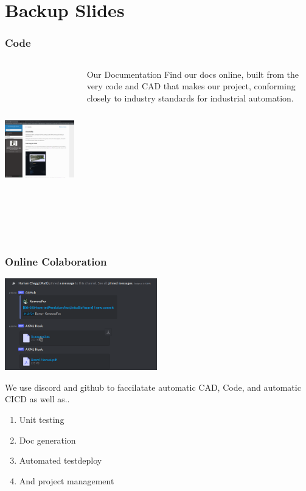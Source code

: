 \documentclass[aspectratio=169]{beamer}
\begin{document}
\section{Backup Slides}
\begin{frame}
    \frametitle{Code}

    \begin{columns}
        \begin{column}{0.58\textwidth}
            \includegraphics[height=7cm]{ManualOnline}
        \end{column}

        \begin{column}{0.38\textwidth}
            \begin{block}{Our Documentation}
                Find our docs online, built from the very code and CAD that
                makes our project, conforming closely to industry standards
                for industrial automation.
            \end{block}
        \end{column}
    \end{columns}
\end{frame}

\begin{frame}
    \frametitle{Online Colaboration}

    \includegraphics[height=4cm]{DevelopmentDiscouse}

    We use discord and github to faccilatate automatic CAD, Code, and automatic
    CI\/CD as well as..

    \begin{enumerate}
     \item Unit testing
     \item Doc generation
     \item Automated test\/deploy
     \item And project management
    \end{enumerate}
\end{frame}
\end{document}
